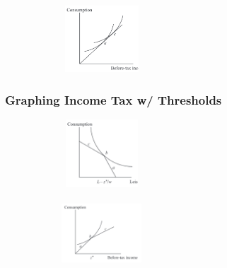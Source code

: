 \documentclass[11pt, english]{article}
\begin{document}
\begin{figure}[H]
\begin{center}
\begin{subfigure}[t]{3.5cm}
                \begin{center}                                                    
                        \includegraphics[width=3cm,height=2.5cm]{EC315-IMG/51.png}
                \end{center}             
                \end{subfigure}
        \end{center}
        \end{figure}

		\subsubsection{Graphing Income Tax w/ Thresholds}
	
	\begin{figure}[H]      
        \begin{center}                     
                \begin{subfigure}[t]{7cm}  
                \begin{center}             
                        \includegraphics[width=3cm,height=2.5cm]{EC315-IMG/52.png}
                \end{center}               
                \end{subfigure}            
                \begin{subfigure}[t]{7cm}  
                \begin{center}                                                    
                        \includegraphics[width=3cm,height=2.5cm]{EC315-IMG/53.png}
                \end{center}   
                \end{subfigure}
        \end{center}
        \end{figure}
\end{document}
